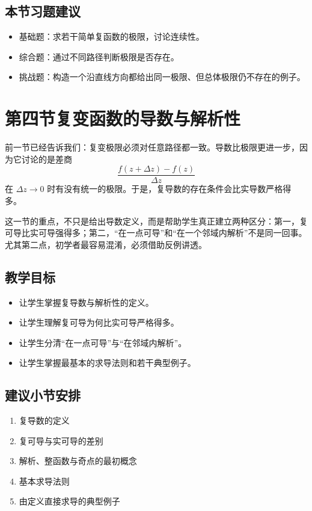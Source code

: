 \subsection*{本节习题建议}
\begin{itemize}
    \item 基础题：求若干简单复函数的极限，讨论连续性。
    \item 综合题：通过不同路径判断极限是否存在。
    \item 挑战题：构造一个沿直线方向都给出同一极限、但总体极限仍不存在的例子。
\end{itemize}

\section{第四节\quad 复变函数的导数与解析性}

\begin{wulibj}[本节要解决的问题]
前一节已经告诉我们：复变极限必须对任意路径都一致。导数比极限更进一步，因为它讨论的是差商
\[
    \frac{f(z+\Delta z)-f(z)}{\Delta z}
\]
在 $\Delta z\to 0$ 时有没有统一的极限。于是，复导数的存在条件会比实导数严格得多。

这一节的重点，不只是给出导数定义，而是帮助学生真正建立两种区分：第一，复可导比实可导强得多；第二，``在一点可导''和``在一个邻域内解析''不是同一回事。尤其第二点，初学者最容易混淆，必须借助反例讲透。
\end{wulibj}

\subsection*{教学目标}
\begin{itemize}
    \item 让学生掌握复导数与解析性的定义。
    \item 让学生理解复可导为何比实可导严格得多。
    \item 让学生分清``在一点可导''与``在邻域内解析''。
    \item 让学生掌握最基本的求导法则和若干典型例子。
\end{itemize}

\subsection*{建议小节安排}
\begin{enumerate}
    \item 复导数的定义
    \item 复可导与实可导的差别
    \item 解析、整函数与奇点的最初概念
    \item 基本求导法则
    \item 由定义直接求导的典型例子
\end{enumerate}

